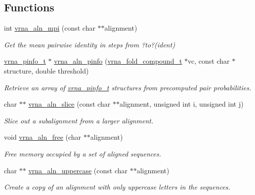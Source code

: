 \subsection*{Functions}
\begin{DoxyCompactItemize}
\item 
int \mbox{\hyperlink{group__aln__utils_gade5a1f2d16e7fd9a57b37d8514f08e8e}{vrna\+\_\+aln\+\_\+mpi}} (const char $\ast$$\ast$alignment)
\begin{DoxyCompactList}\small\item\em Get the mean pairwise identity in steps from ?to?(ident) \end{DoxyCompactList}\item 
\mbox{\hyperlink{group__aln__utils_ga6660dfca23debee7306e0cd53341263f}{vrna\+\_\+pinfo\+\_\+t}} $\ast$ \mbox{\hyperlink{group__aln__utils_gaf6421a1318586c59fea6a127ed9f65f3}{vrna\+\_\+aln\+\_\+pinfo}} (\mbox{\hyperlink{group__fold__compound_ga1b0cef17fd40466cef5968eaeeff6166}{vrna\+\_\+fold\+\_\+compound\+\_\+t}} $\ast$vc, const char $\ast$structure, double threshold)
\begin{DoxyCompactList}\small\item\em Retrieve an array of \mbox{\hyperlink{group__aln__utils_ga6660dfca23debee7306e0cd53341263f}{vrna\+\_\+pinfo\+\_\+t}} structures from precomputed pair probabilities. \end{DoxyCompactList}\item 
char $\ast$$\ast$ \mbox{\hyperlink{group__aln__utils_gac801b0a72eac4ab9d5b2ef7533db9193}{vrna\+\_\+aln\+\_\+slice}} (const char $\ast$$\ast$alignment, unsigned int i, unsigned int j)
\begin{DoxyCompactList}\small\item\em Slice out a subalignment from a larger alignment. \end{DoxyCompactList}\item 
void \mbox{\hyperlink{group__aln__utils_gac00dc80b8a324f151f92f11ab6850ecf}{vrna\+\_\+aln\+\_\+free}} (char $\ast$$\ast$alignment)
\begin{DoxyCompactList}\small\item\em Free memory occupied by a set of aligned sequences. \end{DoxyCompactList}\item 
char $\ast$$\ast$ \mbox{\hyperlink{group__aln__utils_ga3a0476a71c4bae3d302790de58055704}{vrna\+\_\+aln\+\_\+uppercase}} (const char $\ast$$\ast$alignment)
\begin{DoxyCompactList}\small\item\em Create a copy of an alignment with only uppercase letters in the sequences. \end{DoxyCompactList}\item 

\end{DoxyCompactItemize}
